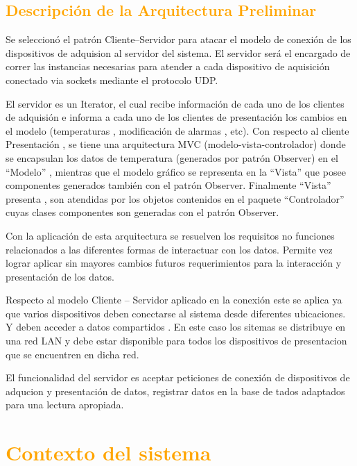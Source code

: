 \subsection{\textcolor{orange}{Descripción de la Arquitectura Preliminar}}
Se seleccionó el patrón Cliente–Servidor para atacar el modelo de conexión de
los dispositivos de adquision al servidor del sistema. El servidor será el
encargado de correr las instancias necesarias para atender a cada dispositivo
de aquisición conectado via sockets mediante el protocolo UDP.

El servidor es un Iterator, el cual recibe información de cada uno de los
clientes de adquisión e informa a cada uno de los clientes de presentación los
cambios en el modelo (temperaturas , modificación de alarmas , etc).
Con respecto al cliente Presentación , se tiene una arquitectura MVC
(modelo-vista-controlador) donde se encapsulan los datos  de
temperatura (generados por patrón Observer) en el “Modelo” , mientras que el
modelo gráfico se representa en la “Vista” que posee componentes generados
también con el patrón Observer. Finalmente “Vista” presenta , son atendidas por
los objetos contenidos en el paquete “Controlador” cuyas clases componentes son
generadas con el patrón Observer.

Con la aplicación de esta arquitectura se resuelven los requisitos no funciones
relacionados a las diferentes formas de interactuar con los datos.
Permite vez lograr aplicar sin mayores cambios futuros requerimientos para la
interacción y presentación de los datos.

Respecto al modelo Cliente – Servidor aplicado en la conexión este se
aplica ya que varios dispositivos deben conectarse al sistema  desde diferentes
ubicaciones. Y deben acceder a datos compartidos . En este caso los sitemas se
distribuye en una red LAN y debe estar disponible para todos los dispositivos de
presentacion que se encuentren en dicha red.

El funcionalidad del servidor es aceptar peticiones de conexión de dispositivos
de adqucion y presentación de datos, registrar datos en la base de tados
adaptados para una lectura apropiada.

\newpage
\section{\textcolor{orange}{Contexto del sistema}}
